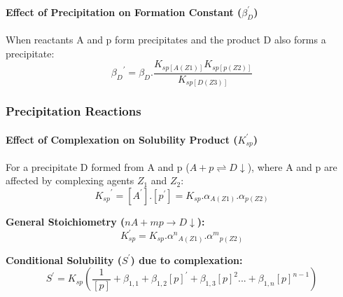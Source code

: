 \paragraph*{Effect of Precipitation on Formation Constant ($\beta_{D}^{\prime}$)}

When reactants A and p form precipitates and the product D also forms a precipitate:
\begin{equation}
{\beta_{D}}^{\prime}=\beta_{D}.\frac{K_{sp[A(Z1)]}K_{sp[p(Z2)]}}{K_{sp[D(Z3)]}}
\end{equation}

\subsubsection*{Precipitation Reactions}

\paragraph*{Effect of Complexation on Solubility Product ($K_{sp}^{\prime}$)}

For a precipitate D formed from A and p ($A+p \rightleftharpoons D\downarrow$), where A and p are affected by complexing agents $Z_1$ and $Z_2$:
\begin{equation}
{K_{sp}}^{\prime}=[A^{\prime}].[p^{\prime}]=K_{sp}.\alpha_{A(Z1)}.\alpha_{p(Z2)}
\end{equation}


\textbf{General Stoichiometry ($nA + mp \rightarrow D\downarrow$):}
\begin{equation}
K_{sp}^{\prime}=K_{sp}.{\alpha^{n}}_{A(Z1)}.{\alpha^{m}}_{p(Z2)}
\end{equation}


\textbf{Conditional Solubility ($S^{\prime}$) due to complexation:}
\begin{equation}
S^{\prime}=K_{sp}(\frac{1}{[p]}+\beta_{1,1}+\beta_{1,2}[p]^{\prime}+\beta_{1,3}[p]^{2}...+\beta_{1,n}[p]^{n-1})
\end{equation}
